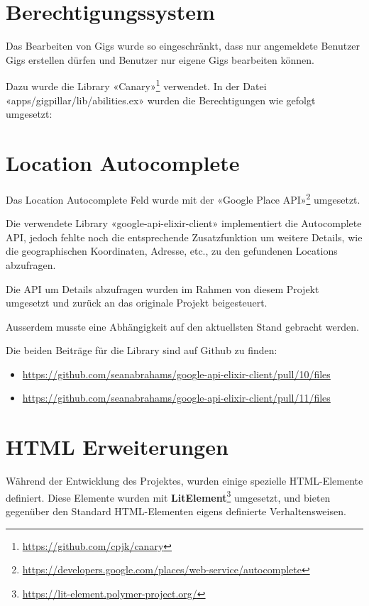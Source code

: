 \clearpage
\section{Berechtigungssystem}

Das Bearbeiten von Gigs wurde so eingeschränkt, dass nur angemeldete Benutzer Gigs erstellen dürfen und Benutzer nur eigene Gigs bearbeiten können.

Dazu wurde die Library «Canary»\footnote{\url{https://github.com/cpjk/canary}} verwendet. In der Datei «apps/gigpillar/lib/abilities.ex» wurden die Berechtigungen wie gefolgt umgesetzt:



\clearpage
\section{Location Autocomplete}

Das Location Autocomplete Feld wurde mit der «Google Place API»\footnote{\url{https://developers.google.com/places/web-service/autocomplete}} umgesetzt.

Die verwendete Library «google-api-elixir-client» implementiert die
Autocomplete API, jedoch fehlte noch die entsprechende Zusatzfunktion um
weitere Details, wie die geographischen Koordinaten, Adresse, etc., zu den gefundenen Locations abzufragen.

Die API um Details abzufragen wurden im Rahmen von diesem Projekt umgesetzt
und zurück an das originale Projekt beigesteuert.

Ausserdem musste eine Abhängigkeit auf den aktuellsten Stand gebracht werden.

Die beiden Beiträge für die Library sind auf Github zu finden:

\begin{itemize}
  \item{} \url{https://github.com/seanabrahams/google-api-elixir-client/pull/10/files}
  \item{} \url{https://github.com/seanabrahams/google-api-elixir-client/pull/11/files}
\end{itemize}

\clearpage
\section{HTML Erweiterungen}

Während der Entwicklung des Projektes, wurden einige spezielle HTML-Elemente
definiert. Diese Elemente wurden mit \textbf{LitElement}\footnote{\url{https://lit-element.polymer-project.org/}}
umgesetzt, und bieten gegenüber den Standard HTML-Elementen eigens definierte
Verhaltensweisen.


